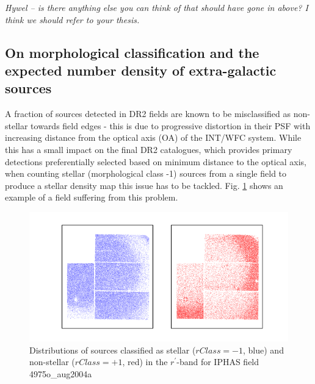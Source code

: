 \documentclass[a4paper,useAMS,usenatbib]{mn2e}
\begin{document}
{\sl Hywel -- is there anything else you can think of that should have gone in above?  I think we should refer to your thesis.}


\subsection{On morphological classification and the expected number density of extra-galactic sources}
\label{subsec:galaxy_density}

A fraction of sources detected in DR2 fields are known to be misclassified as 
non-stellar towards field edges - this is due to progressive distortion in their PSF with increasing distance from the 
optical axis (OA) of the INT/WFC system. While this has a small impact on the final DR2 catalogues, which provides primary 
detections preferentially selected based on minimum distance to the optical axis, when counting stellar (morphological class -1) 
sources from a single field to produce a stellar density map this issue has to be tackled. Fig. \ref{fig:misclassification} 
shows an example of a field suffering from this problem.

\begin{figure}
\begin{center}
\includegraphics[width=1\linewidth]{figures/morphology_misclassification.png} 
\caption{\footnotesize{Distributions of sources classified as stellar ($rClass=-1$, blue) 
and non-stellar ($rClass=+1$, red) in the $r^{\prime}$-band for IPHAS field 4975o\_aug2004a} }
\label{fig:misclassification}
\end{center}
\end{figure}
\end{document}

